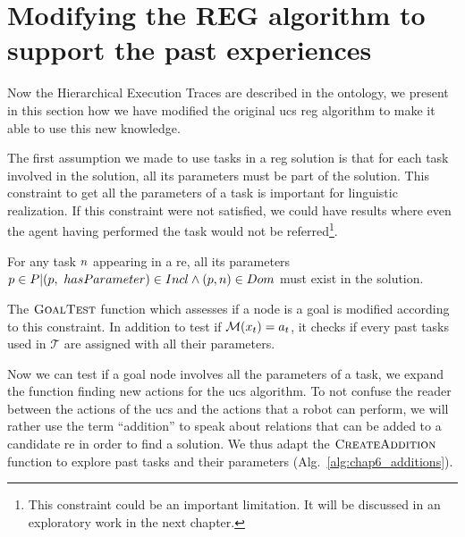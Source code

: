 \section[REG algorithm modifications]{Modifying the REG algorithm to support the past experiences}

Now the Hierarchical Execution Traces are described in the ontology, we present in this section how we have modified the original \acrfull{ucs} \acrshort{reg} algorithm to make it able to use this new knowledge.

The first assumption we made to use tasks in a \acrshort{reg} solution is that for each task involved in the solution, all its parameters must be part of the solution. This constraint to get all the parameters of a task is important for linguistic realization. If this constraint were not satisfied, we could have results where even the agent having performed the task would not be referred\footnote{This constraint could be an important limitation. It will be discussed in an exploratory work in the next chapter.}.

\begin{theorem} 
\label{the:complete_intance}
For any task $n$ appearing in a \acrshort{re}, all its parameters $p \in P | (p,\ hasParameter) \in Incl \wedge (p, n) \in Dom$ must exist in the solution.
\end{theorem}

The $\textsc{GoalTest}$ function which assesses if a node is a goal is modified according to this constraint. In addition to test if $\mathcal{M}(x_t) = a_t$, it checks if every past tasks used in $\mathcal{T}$ are assigned with all their parameters.

Now we can test if a goal node involves all the parameters of a task, we expand the function finding new actions for the \acrshort{ucs} algorithm. To not confuse the reader between the actions of the \acrshort{ucs} and the actions that a robot can perform, we will rather use the term ``addition'' to speak about relations that can be added to a candidate \acrshort{re} in order to find a solution. We thus adapt the $\textsc{CreateAddition}$ function to explore past tasks and their parameters (Alg.~\ref{alg:chap6_additions}).

